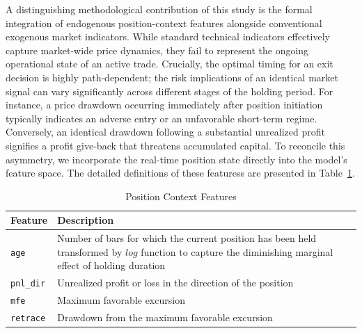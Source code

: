 \documentclass[12pt]{article}
\begin{document}
A distinguishing methodological contribution of this study is the formal integration of endogenous position-context features alongside conventional exogenous market indicators. While standard technical indicators effectively capture market-wide price dynamics, they fail to represent the ongoing operational state of an active trade. Crucially, the optimal timing for an exit decision is highly path-dependent; the risk implications of an identical market signal can vary significantly across different stages of the holding period. For instance, a price drawdown occurring immediately after position initiation typically indicates an adverse entry or an unfavorable short-term regime. Conversely, an identical drawdown following a substantial unrealized profit signifies a profit give-back that threatens accumulated capital. To reconcile this asymmetry, we incorporate the real-time position state directly into the model's feature space. The detailed definitions of these featuress are presented in Table~\ref{tab:position_context_features}.

\begin{table}[H]
\centering
\caption{Position Context Features}
\label{tab:position_context_features}
\small
\renewcommand{\arraystretch}{1.2}
\begin{tabular}{p{}p{}}
\toprule
Feature & Description \\
\midrule
\texttt{age} & Number of bars for which the current position has been held transformed by $log$ function to capture the diminishing marginal effect of holding duration \\
\texttt{pnl\_dir} & Unrealized profit or loss in the direction of the position \\
\texttt{mfe} & Maximum favorable excursion \\
\texttt{retrace} & Drawdown from the maximum favorable excursion \\
\bottomrule
\end{tabular}
\end{table}
\end{document}
